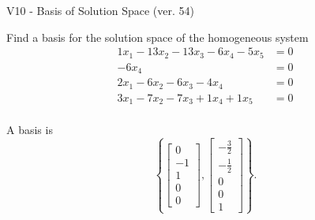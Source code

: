 \begin{exercise}
  \begin{exerciseTitle}V10 - Basis of Solution Space (ver. 54)\end{exerciseTitle}
  \begin{exerciseStatement}
    Find a basis for the solution space of the homogeneous system 
\begin{align*}
 1 x_ 1 -13 x_ 2 -13 x_ 3 -6 x_ 4 -5 x_ 5 &= 0  \\ 
  -6 x_ 4 &= 0  \\ 
  2 x_ 1 -6 x_ 2 -6 x_ 3 -4 x_ 4 &= 0  \\ 
  3 x_ 1 -7 x_ 2 -7 x_ 3 + 1 x_ 4 + 1 x_ 5 &= 0  \\ 
 \end{align*}


 
  \end{exerciseStatement}

  \begin{exerciseAnswer}
   A basis is   
\[\left\{\left[\begin{array}{c}
0 \\
-1 \\
1 \\
0 \\
0
\end{array}\right] , \left[\begin{array}{c}
-\frac{3}{2} \\
-\frac{1}{2} \\
0 \\
0 \\
1
\end{array}\right]\right\}.\]

  


  \end{exerciseAnswer}
\end{exercise}